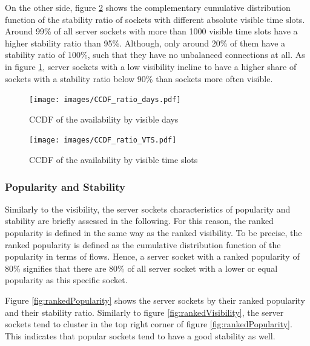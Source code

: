 On the other side, figure \ref{fig:ccdf_ratio_vts} shows the complementary cumulative distribution function of the stability ratio of sockets with different absolute visible time slots. 
Around 99\% of all \glspl{server socket} with more than 1000 visible time slots have a higher stability ratio than 95\%.
Although, only around 20\% of them have a stability ratio of 100\%, such that they have no unbalanced connections at all.
As in figure \ref{fig:ccdf_ratio_days}, \glspl{server socket} with a low visibility incline to have a higher share of sockets with a stability ratio below 90\% than sockets more often visible.

\begin{landscape}
\begin{figure}
	[p] \centering
	\texttt{[image: images/CCDF\_ratio\_days.pdf]}
	\caption{CCDF of the availability by visible days}
	\label{fig:ccdf_ratio_days}
\end{figure}
\end{landscape}

\begin{landscape}
\begin{figure}
	[p] \centering
	\texttt{[image: images/CCDF\_ratio\_VTS.pdf]}
	\caption{CCDF of the availability by visible time slots}
	\label{fig:ccdf_ratio_vts}
\end{figure}
\end{landscape}

\subsubsection{Popularity and Stability}
Similarly to the visibility, the \glspl{server socket} characteristics of popularity and stability are briefly assessed in the following. 
For this reason, the ranked popularity is defined in the same way as the ranked visibility.
To be precise, the ranked popularity is defined as the cumulative distribution function of the popularity in terms of flows. 
Hence, a \gls{server socket} with a ranked popularity of 80\% signifies that there are 80\% of all \gls{server socket} with a lower or equal popularity as this specific socket.

Figure \ref{fig:rankedPopularity} shows the \glspl{server socket} by their ranked popularity and their stability ratio. 
Similarly to figure \ref{fig:rankedVisibility}, the \glspl{server socket} tend to cluster in the top right corner of figure \ref{fig:rankedPopularity}. This indicates that popular sockets tend to have a good stability as well.

